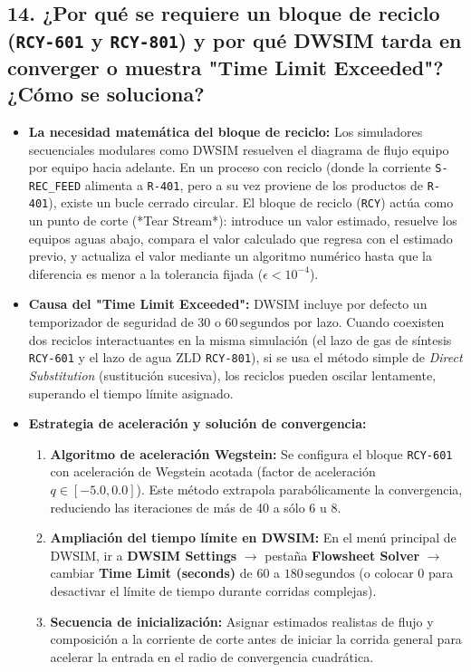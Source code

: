 \documentclass[11pt,a4paper]{article}
\begin{document}
\subsection{14. ¿Por qué se requiere un bloque de reciclo (\texttt{RCY-601} y \texttt{RCY-801}) y por qué DWSIM tarda en converger o muestra "Time Limit Exceeded"? ¿Cómo se soluciona?}
\begin{itemize}
    \item \textbf{La necesidad matemática del bloque de reciclo:} Los simuladores secuenciales modulares como DWSIM resuelven el diagrama de flujo equipo por equipo hacia adelante. En un proceso con reciclo (donde la corriente \texttt{S-REC\_FEED} alimenta a \texttt{R-401}, pero a su vez proviene de los productos de \texttt{R-401}), existe un bucle cerrado circular. El bloque de reciclo (\texttt{RCY}) actúa como un punto de corte (*Tear Stream*): introduce un valor estimado, resuelve los equipos aguas abajo, compara el valor calculado que regresa con el estimado previo, y actualiza el valor mediante un algoritmo numérico hasta que la diferencia es menor a la tolerancia fijada ($\epsilon < 10^{-4}$).
    \item \textbf{Causa del "Time Limit Exceeded":} DWSIM incluye por defecto un temporizador de seguridad de $30\text{ o }60\,\text{segundos}$ por lazo. Cuando coexisten dos reciclos interactuantes en la misma simulación (el lazo de gas de síntesis \texttt{RCY-601} y el lazo de agua ZLD \texttt{RCY-801}), si se usa el método simple de \textit{Direct Substitution} (sustitución sucesiva), los reciclos pueden oscilar lentamente, superando el tiempo límite asignado.
    \item \textbf{Estrategia de aceleración y solución de convergencia:}
    \begin{enumerate}
        \item \textbf{Algoritmo de aceleración Wegstein:} Se configura el bloque \texttt{RCY-601} con aceleración de Wegstein acotada (factor de aceleración $q \in [-5.0, 0.0]$). Este método extrapola parabólicamente la convergencia, reduciendo las iteraciones de más de 40 a sólo 6 u 8.
        \item \textbf{Ampliación del tiempo límite en DWSIM:} En el menú principal de DWSIM, ir a \textbf{DWSIM Settings} $\to$ pestaña \textbf{Flowsheet Solver} $\to$ cambiar \textbf{Time Limit (seconds)} de $60$ a \textbf{$180\,\text{segundos}$} (o colocar $0$ para desactivar el límite de tiempo durante corridas complejas).
        \item \textbf{Secuencia de inicialización:} Asignar estimados realistas de flujo y composición a la corriente de corte antes de iniciar la corrida general para acelerar la entrada en el radio de convergencia cuadrática.
    \end{enumerate}
\end{itemize}
\end{document}
